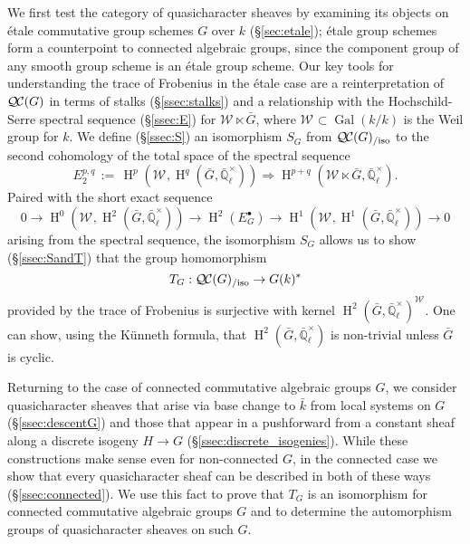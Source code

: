 \documentclass[10pt]{amsart}
\theoremstyle{plain}
\theoremstyle{definition}
\theoremstyle{remark}
\newcommand{\EE}{\mathbb{\bar Q}_\ell}
\newcommand{\bFq}{\bar{k}}
\newcommand{\Fq}{k}
\newcommand{\EEx}{\EE^\times}
\newcommand{\Weil}[1]{\mathcal{W}_{#1}}
\DeclareMathOperator{\Gal}{Gal}
\DeclareMathOperator{\Hom}{Hom}
\DeclareMathOperator{\Hh}{H}
\newcommand{\ceq}{{\, :=\, }}
\newcommand{\TrFrob}[1]{T_{#1}}
\newcommand{\gqcs}[1]{{\mathcal{\bar #1}}}
\newcommand{\QC}{{\mathcal{Q\hskip-0.8pt C}}}
\newcommand{\QCiso}[1]{\QC(#1)_{/\text{iso}}}
\newcommand{\bG}{\bar{G}}
\begin{document}
We first test the category of quasicharacter sheaves by examining its objects on \'etale commutative group schemes $G$ over $\Fq$ (\S\ref{sec:etale});
\'etale group schemes form a counterpoint to connected algebraic groups, since the component group of any smooth group scheme is an \'etale group scheme.
Our key tools for understanding the trace of Frobenius in the \'etale case are a reinterpretation of $\QC(G)$ in terms of stalks (\S\ref{ssec:stalks}) and a
relationship with the Hochschild-Serre spectral sequence (\S\ref{ssec:E}) for $\Weil{} \ltimes \bG$, where $\Weil{} \subset \Gal(\Fq/\Fq)$ is the Weil group for $\Fq$.
We define (\S\ref{ssec:S}) an isomorphism $S_G$ from $\QCiso{G}$ to the second cohomology of the total space of the spectral sequence
\[
E_2^{p,q} \ceq \Hh^p(\Weil{}, \Hh^q(\bG, \EEx)) \Rightarrow \Hh^{p+q}(\Weil{} \ltimes \bG, \EEx).
\]
Paired with the short exact sequence
\[
  0 \to \Hh^0(\Weil{},\Hh^2({\bar G},\EEx)) \to \Hh^2(E^\bullet_G) \to \Hh^1(\Weil{},\Hh^1({\bar G},\EEx)) \to 0
\]
arising from the spectral sequence, the isomorphism $S_G$ allows us to show (\S\ref{ssec:SandT}) that 
the group homomorphism 
\[
\TrFrob{G}: \QCiso{G} \to G(\Fq)^*
\]
provided by the trace of Frobenius is surjective with kernel $\Hh^2(\bG,\EEx)^{\Weil{}}$.
One can show, using the K\"unneth formula, that $\Hh^2(\bG,\EEx)$ is non-trivial unless $\bG$ is cyclic.

Returning to the case of connected commutative algebraic groups $G$, we consider quasicharacter sheaves that arise via base change to $\bFq$ from local systems on $G$ (\S\ref{ssec:descentG}) and
those that appear in a pushforward from a constant sheaf along a discrete isogeny $H \to G$ (\S\ref{ssec:discrete_isogenies}).  While these constructions make sense even for non-connected $G$, in the connected
case we show that every quasicharacter sheaf can be described in both of these ways (\S\ref{ssec:connected}).  We use this fact to prove that $\TrFrob{G}$ is an isomorphism for connected commutative algebraic groups $G$
and to determine the automorphism groups of quasicharacter sheaves on such $G$.

\end{document}

